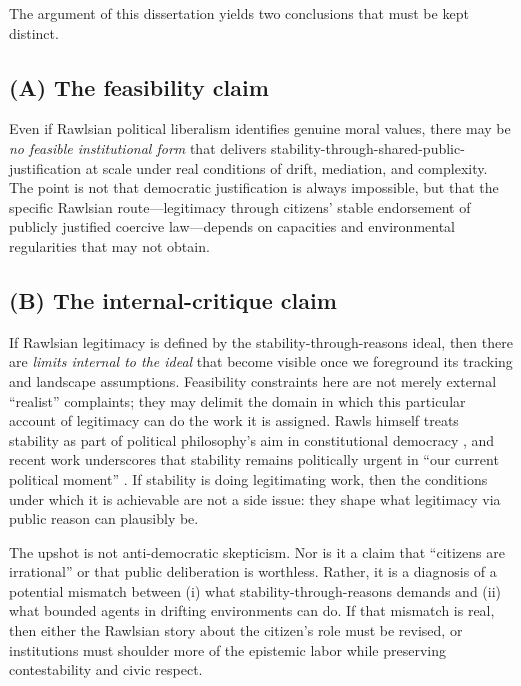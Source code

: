 \documentclass[12pt]{report}
\begin{document}
The argument of this dissertation yields two conclusions that must be kept distinct.

\subsection*{(A) The feasibility claim}

Even if Rawlsian political liberalism identifies genuine moral values, there may be \emph{no feasible institutional form} that delivers stability-through-shared-public-justification at scale under real conditions of drift, mediation, and complexity.  The point is not that democratic justification is always impossible, but that the specific Rawlsian route---legitimacy through citizens' stable endorsement of publicly justified coercive law---depends on capacities and environmental regularities that may not obtain.

\subsection*{(B) The internal-critique claim}

If Rawlsian legitimacy is defined by the stability-through-reasons ideal, then there are \emph{limits internal to the ideal} that become visible once we foreground its tracking and landscape assumptions.  Feasibility constraints here are not merely external ``realist'' complaints; they may delimit the domain in which this particular account of legitimacy can do the work it is assigned.  Rawls himself treats stability as part of political philosophy's aim in constitutional democracy \parencite[p.~1]{rawls1987overlapping}, and recent work underscores that stability remains politically urgent in ``our current political moment'' \parencite[p.~1187]{Weithman2024Rescuing}.  If stability is doing legitimating work, then the conditions under which it is achievable are not a side issue: they shape what legitimacy via public reason can plausibly be.

The upshot is not anti-democratic skepticism.  Nor is it a claim that ``citizens are irrational'' or that public deliberation is worthless.  Rather, it is a diagnosis of a potential mismatch between (i) what stability-through-reasons demands and (ii) what bounded agents in drifting environments can do.  If that mismatch is real, then either the Rawlsian story about the citizen's role must be revised, or institutions must shoulder more of the epistemic labor while preserving contestability and civic respect.
\end{document}
